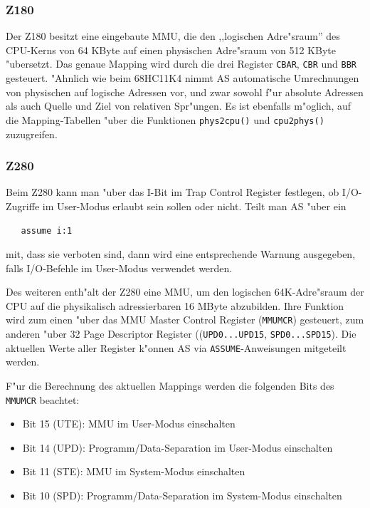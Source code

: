 \documentclass[12pt,a4paper,twoside]{report}
\newcommand{\asname}{AS}
\begin{document}

\subsubsection{Z180}

Der Z180 besitzt eine eingebaute MMU, die den ,,logischen Adre"sraum'' des
CPU-Kerns von 64 KByte auf einen physischen Adre"sraum von 512 KByte "ubersetzt.
Das genaue Mapping wird durch die drei Register {\tt CBAR}, {\tt CBR} und {\tt BBR}
gesteuert.  "Ahnlich wie beim 68HC11K4 nimmt \asname{} automatische Umrechnungen
von physischen auf logische Adressen vor, und zwar sowohl f"ur absolute Adressen
als auch Quelle und Ziel von relativen Spr"ungen.  Es ist ebenfalls m"oglich, auf
die Mapping-Tabellen "uber die Funktionen {\tt phys2cpu()} und {\tt cpu2phys()}
zuzugreifen.


\subsubsection{Z280}

Beim Z280 kann man "uber das I-Bit im Trap Control Register festlegen, ob
I/O-Zugriffe im User-Modus erlaubt sein sollen oder nicht.  Teilt man \asname{}
"uber ein
\begin{verbatim}
   assume i:1
\end{verbatim}
mit, dass sie verboten sind, dann wird eine entsprechende Warnung ausgegeben,
falls I/O-Befehle im User-Modus verwendet werden.

Des weiteren enth"alt der Z280 eine MMU, um den logischen 64K-Adre"sraum der
CPU auf die physikalisch adressierbaren 16 MByte abzubilden.  Ihre Funktion
wird zum einen "uber das MMU Master Control Register ({\tt MMUMCR}) gesteuert,
zum anderen "uber 32 Page Descriptor Register (({\tt UPD0...UPD15},
{\tt SPD0...SPD15}).  Die aktuellen Werte aller Register k"onnen \asname{} via
{\tt ASSUME}-Anweisungen mitgeteilt werden.

F"ur die Berechnung des aktuellen Mappings werden die folgenden Bits
des {\tt MMUMCR} beachtet:
\begin{itemize}
\item{Bit 15 (UTE): MMU im User-Modus einschalten}
\item{Bit 14 (UPD): Programm/Data-Separation im User-Modus einschalten}
\item{Bit 11 (STE): MMU im System-Modus einschalten}
\item{Bit 10 (SPD): Programm/Data-Separation im System-Modus einschalten}
\end{itemize}
\end{document}
